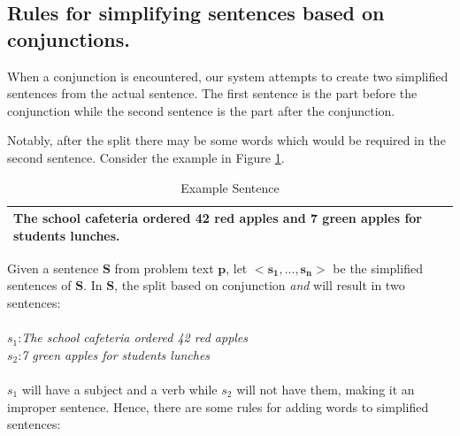 \documentclass[11pt]{article}
\begin{document}
\subsection{Rules for simplifying sentences based on conjunctions.}\label{sec:simplifyingrules}
 When a conjunction is encountered, our system attempts to create two simplified sentences from the actual sentence. The first sentence is the part before the conjunction while the second sentence is the part after the conjunction.

Notably, after the split there may be some words which would be required in the second sentence. Consider the example in Figure \ref{figure:8}.

\begin{table}[h!]
\centering
\begin{tabular}{ | m{25em} | }
\hline
The school cafeteria ordered 42 red apples and 7 green apples for students lunches.\\
\hline
\end{tabular}
\caption{Example Sentence}
\label{figure:8}
\end{table}

Given a sentence $\mathbf{S}$ from problem text $\mathbf{p}$, let $\mathbf{<s_{1},..., s_{n}>}$ be the simplified sentences of $\mathbf{S}$. In $\mathbf{S}$, the split based on conjunction \textit{and} will result in two sentences: \\
\\
\begin{math}s_{1}\end{math}:\textit{The school cafeteria ordered 42 red apples}\\
\begin{math}s_{2}\end{math}:\textit{7 green apples for students lunches}

\paragraph{}
\begin{math}s_{1}\end{math} will have a subject and a verb while \begin{math}s_{2}\end{math} will not have them, making it an improper sentence. Hence, there are some rules for adding words to simplified sentences:
\end{document}

